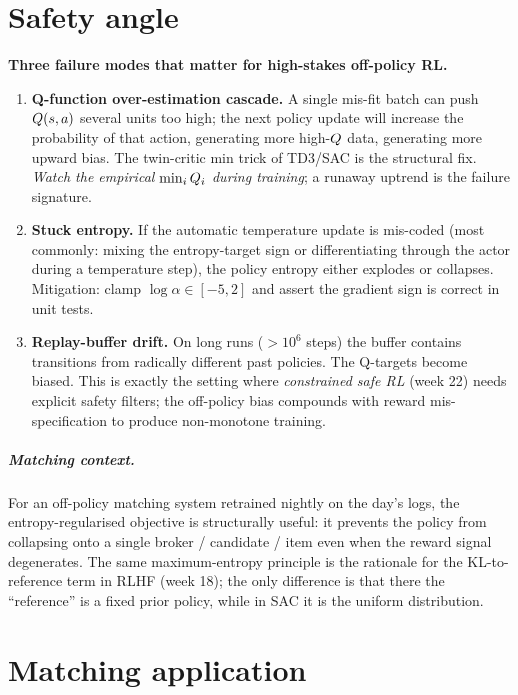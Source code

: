 \documentclass[11pt,oneside]{scrbook}
\begin{document}
\chapter{Safety angle}

\begin{safetyangle}
\textbf{Three failure modes that matter for high-stakes off-policy RL.}

\begin{enumerate}[leftmargin=*]
  \item \textbf{Q-function over-estimation cascade.} A single mis-fit batch can push $Q(s,a)$ several units too high; the next policy update will increase the probability of that action, generating more high-$Q$ data, generating more upward bias. The twin-critic min trick of TD3/SAC is the structural fix. \emph{Watch the empirical $\min_i Q_i$ during training}; a runaway uptrend is the failure signature.
  \item \textbf{Stuck entropy.} If the automatic temperature update is mis-coded (most commonly: mixing the entropy-target sign or differentiating through the actor during a temperature step), the policy entropy either explodes or collapses. Mitigation: clamp $\log\alpha \in [-5, 2]$ and assert the gradient sign is correct in unit tests.
  \item \textbf{Replay-buffer drift.} On long runs ($> 10^6$ steps) the buffer contains transitions from radically different past policies. The Q-targets become biased. This is exactly the setting where \emph{constrained safe RL} (week 22) needs explicit safety filters; the off-policy bias compounds with reward mis-specification to produce non-monotone training.
\end{enumerate}

\paragraph{Matching context.}
For an off-policy matching system retrained nightly on the day's logs, the entropy-regularised objective is structurally useful: it prevents the policy from collapsing onto a single broker / candidate / item even when the reward signal degenerates. The same maximum-entropy principle is the rationale for the KL-to-reference term in RLHF (week 18); the only difference is that there the ``reference'' is a fixed prior policy, while in SAC it is the uniform distribution.
\end{safetyangle}

\chapter{Matching application}
\end{document}
